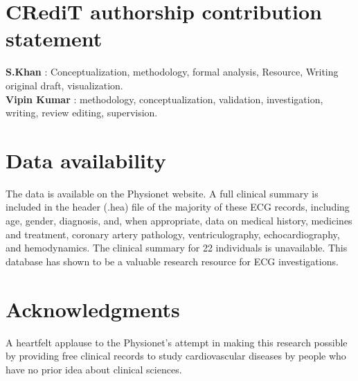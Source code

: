 \documentclass[a4paper, fleqn]{cas-sc}
\begin{document}
\begin{table}[htbp]
    \label{tab:error_metrics}
\end{table}


 
 
 




























\section*{CRediT authorship contribution statement}

\textbf{S.Khan} : Conceptualization, methodology, formal analysis, Resource, Writing original draft, visualization.\\
\textbf{Vipin Kumar} : methodology, conceptualization, validation, investigation, writing, review editing, supervision.

\section*{Data availability}



The data is available on the Physionet website. A full clinical summary is included in the header (.hea) file of the majority of these ECG records, including age, gender, diagnosis, and, when appropriate, data on medical history, medicines and treatment, coronary artery pathology, ventriculography, echocardiography, and hemodynamics. The clinical summary for 22 individuals is unavailable. This database has shown to be a valuable research resource for ECG investigations.





\section*{Acknowledgments}

A heartfelt applause to the Physionet's attempt in making this research possible by providing free clinical records to study cardiovascular diseases by people who have no prior idea about clinical sciences. 
\end{document}

